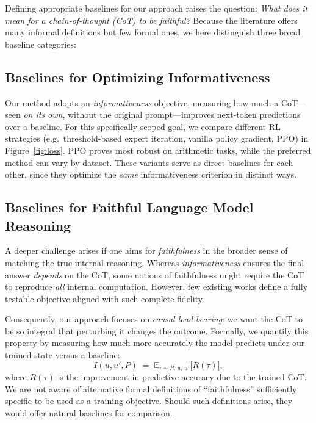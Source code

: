 \documentclass{article}
\theoremstyle{plain}
\theoremstyle{definition}
\theoremstyle{remark}
\begin{document}
Defining appropriate baselines for our approach raises the question: \emph{What does it mean for a chain-of-thought (CoT) to be faithful?} Because the literature offers many informal definitions but few formal ones, we here distinguish three broad baseline categories:

\subsection{Baselines for Optimizing Informativeness}
\label{app:baselines_informativeness}

Our method adopts an \emph{informativeness} objective, measuring how much a CoT---seen \emph{on its own}, without the original prompt---improves next-token predictions over a baseline. For this specifically scoped goal, we compare different RL strategies (e.g.\ threshold-based expert iteration, vanilla policy gradient, PPO) in Figure~\ref{fig:loss}. PPO proves most robust on arithmetic tasks, while the preferred method can vary by dataset. These variants serve as direct baselines for each other, since they optimize the \emph{same} informativeness criterion in distinct ways.

\subsection{Baselines for Faithful Language Model Reasoning}
\label{app:baselines_faithfulness}

A deeper challenge arises if one aims for \emph{faithfulness} in the broader sense of matching the true internal reasoning. Whereas \emph{informativeness} ensures the final answer \emph{depends} on the CoT, some notions of faithfulness might require the CoT to reproduce \emph{all} internal computation. However, few existing works define a fully testable objective aligned with such complete fidelity.

Consequently, our approach focuses on \emph{causal load-bearing}: we want the CoT to be so integral that perturbing it changes the outcome. Formally, we quantify this property by measuring how much more accurately the model predicts under our trained state versus a baseline:
\begin{equation}
\label{eq:informativeness_objective}
    I(u, u', P)
    \;=\;
    \mathbb{E}_{\tau \sim P,\,u,\,u'} 
    \bigl[
        R(\tau)
    \bigr],
\end{equation}
where $R(\tau)$ is the improvement in predictive accuracy due to the trained CoT.
We are not aware of alternative formal definitions of ``faithfulness'' sufficiently specific to be used as a training objective. Should such definitions arise, they would offer natural baselines for comparison.
\end{document}
